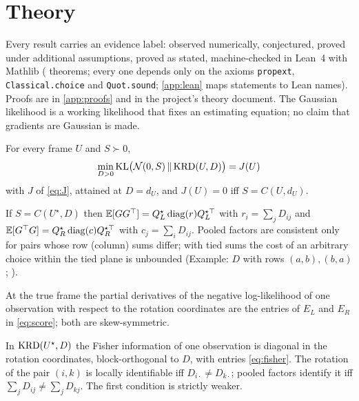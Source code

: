\section{Theory}
\label{sec:theory}

Every result carries an evidence label:  observed numerically,  conjectured,
 proved under additional assumptions,  proved as stated,  machine-checked in
Lean~4 with Mathlib (\LeanCount{} theorems; every one depends only on the axioms \texttt{propext},
\texttt{Classical.choice} and \texttt{Quot.sound}; \cref{app:lean} maps statements to Lean names).
Proofs are in \cref{app:proofs} and in the project's theory document. The Gaussian likelihood is a
working likelihood that fixes an estimating equation; no claim that gradients are Gaussian is made.

\begin{proposition}\label{prop:J}
For every frame $U$ and $S\succ0$,
\[\min_{D>0}\mathrm{KL}\bigl(\mathcal N(0,S)\,\|\,\mathrm{KRD}(U,D)\bigr)=J(U)\]
with $J$ of \eqref{eq:J}, attained at $D=d_U$, and $J(U)=0$ iff $S=C(U,d_U)$.
\end{proposition}

\begin{proposition}\label{prop:pooled}
If $S=C(U^\star,D)$ then $\mathbb{E}[GG^\top]=Q_L^\star\operatorname{diag}(r)Q_L^{\star\top}$ with $r_i=\sum_jD_{ij}$ and
$\mathbb{E}[G^\top G]=Q_R^\star\operatorname{diag}(c)Q_R^{\star\top}$ with $c_j=\sum_iD_{ij}$. Pooled factors are
consistent only for pairs whose row (column) sums differ; with tied sums the cost of an arbitrary
choice within the tied plane is unbounded (Example: $D$ with rows $(a,b),(b,a)$; ).
\end{proposition}

\begin{lemma}\label{lem:score}
At the true frame the partial derivatives of the negative log-likelihood of one observation with
respect to the rotation coordinates are the entries of $E_L$ and $E_R$ in \eqref{eq:score}; both
are skew-symmetric.
\end{lemma}

\begin{theorem}\label{thm:fisher}
In $\mathrm{KRD}(U^\star,D)$ the Fisher information of one observation is diagonal in the rotation
coordinates, block-orthogonal to $D$, with entries \eqref{eq:fisher}. The rotation of the pair
$(i,k)$ is locally identifiable iff $D_{i\cdot}\ne D_{k\cdot}$; pooled factors identify it iff
$\sum_jD_{ij}\ne\sum_jD_{kj}$. The first condition is strictly weaker.
\end{theorem}

